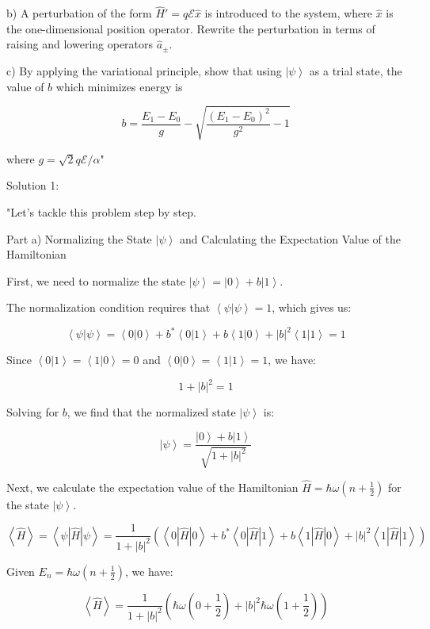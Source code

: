 b) A perturbation of the form \( \hat{H}' = q \mathcal{E} \hat{x} \) is introduced to the system, where \( \hat{x} \) is the one-dimensional position operator. Rewrite the perturbation in terms of raising and lowering operators \( \hat{a}_{\pm} \).

c) By applying the variational principle, show that using \( \left| \psi \right> \) as a trial state, the value of \( b \) which minimizes energy is 

\[ b = \frac{E_{1} - E_{0}}{g} - \sqrt{\frac{(E_{1} - E_{0})^{2}}{g^{2}} -1} \]

where \( g = \sqrt{2} q \mathcal{E} / {\alpha} \)"

Solution 1:

"Let's tackle this problem step by step.

Part a) Normalizing the State \( \left| \psi \right> \) and Calculating the Expectation Value of the Hamiltonian

First, we need to normalize the state \( \left| \psi \right> = \left| 0 \right> + b \left| 1 \right> \).

The normalization condition requires that \( \left< \psi | \psi \right> = 1 \), which gives us:

\[ \left< \psi | \psi \right> = \left< 0 | 0 \right> + b^* \left< 0 | 1 \right> + b \left< 1 | 0 \right> + |b|^2 \left< 1 | 1 \right> = 1 \]

Since \( \left< 0 | 1 \right> = \left< 1 | 0 \right> = 0 \) and \( \left< 0 | 0 \right> = \left< 1 | 1 \right> = 1 \), we have:

\[ 1 + |b|^2 = 1 \]

Solving for \( b \), we find that the normalized state \( \left| \psi \right> \) is:

\[ \left| \psi \right> = \frac{\left| 0 \right> + b \left| 1 \right>}{\sqrt{1 + |b|^2}} \]

Next, we calculate the expectation value of the Hamiltonian \( \hat{H} = \hbar\omega(n+\frac{1}{2}) \) for the state \( \left| \psi \right> \).

\[ \left< \hat{H} \right> = \left< \psi | \hat{H} | \psi \right> = \frac{1}{1+|b|^2} \left( \left< 0 | \hat{H} | 0 \right> + b^* \left< 0 | \hat{H} | 1 \right> + b \left< 1 | \hat{H} | 0 \right> + |b|^2 \left< 1 | \hat{H} | 1 \right> \right) \]

Given \( E_{n} = \hbar\omega(n+\frac{1}{2}) \), we have:

\[ \left< \hat{H} \right> = \frac{1}{1+|b|^2} \left( \hbar\omega(0+\frac{1}{2}) + |b|^2\hbar\omega(1+\frac{1}{2}) \right) \]

